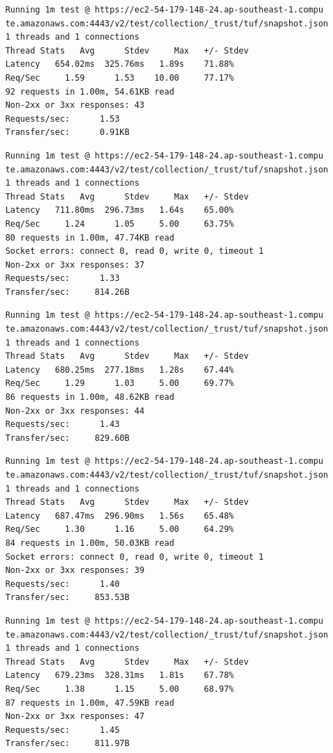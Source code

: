 \documentclass[a4paper,12pt]{article}
\newcounter{subsubsubsection}[subsubsection]
\begin{document}
{{	
	\begin{verbatim}
	Running 1m test @ https://ec2-54-179-148-24.ap-southeast-1.compu
	te.amazonaws.com:4443/v2/test/collection/_trust/tuf/snapshot.json
	1 threads and 1 connections
	Thread Stats   Avg      Stdev     Max   +/- Stdev
	Latency   654.02ms  325.76ms   1.89s    71.88%
	Req/Sec     1.59      1.53    10.00     77.17%
	92 requests in 1.00m, 54.61KB read
	Non-2xx or 3xx responses: 43
	Requests/sec:      1.53
	Transfer/sec:      0.91KB
	\end{verbatim}
	\begin{verbatim}
	Running 1m test @ https://ec2-54-179-148-24.ap-southeast-1.compu
	te.amazonaws.com:4443/v2/test/collection/_trust/tuf/snapshot.json
	1 threads and 1 connections
	Thread Stats   Avg      Stdev     Max   +/- Stdev
	Latency   711.80ms  296.73ms   1.64s    65.00%
	Req/Sec     1.24      1.05     5.00     63.75%
	80 requests in 1.00m, 47.74KB read
	Socket errors: connect 0, read 0, write 0, timeout 1
	Non-2xx or 3xx responses: 37
	Requests/sec:      1.33
	Transfer/sec:     814.26B
	\end{verbatim}
	\begin{verbatim}
	Running 1m test @ https://ec2-54-179-148-24.ap-southeast-1.compu
	te.amazonaws.com:4443/v2/test/collection/_trust/tuf/snapshot.json
	1 threads and 1 connections
	Thread Stats   Avg      Stdev     Max   +/- Stdev
	Latency   680.25ms  277.18ms   1.28s    67.44%
	Req/Sec     1.29      1.03     5.00     69.77%
	86 requests in 1.00m, 48.62KB read
	Non-2xx or 3xx responses: 44
	Requests/sec:      1.43
	Transfer/sec:     829.60B
	\end{verbatim}
	\begin{verbatim}
	Running 1m test @ https://ec2-54-179-148-24.ap-southeast-1.compu
	te.amazonaws.com:4443/v2/test/collection/_trust/tuf/snapshot.json
	1 threads and 1 connections
	Thread Stats   Avg      Stdev     Max   +/- Stdev
	Latency   687.47ms  296.90ms   1.56s    65.48%
	Req/Sec     1.30      1.16     5.00     64.29%
	84 requests in 1.00m, 50.03KB read
	Socket errors: connect 0, read 0, write 0, timeout 1
	Non-2xx or 3xx responses: 39
	Requests/sec:      1.40
	Transfer/sec:     853.53B
	\end{verbatim}
	\newpage
	\begin{verbatim}
	Running 1m test @ https://ec2-54-179-148-24.ap-southeast-1.compu
	te.amazonaws.com:4443/v2/test/collection/_trust/tuf/snapshot.json
	1 threads and 1 connections
	Thread Stats   Avg      Stdev     Max   +/- Stdev
	Latency   679.23ms  328.31ms   1.81s    67.78%
	Req/Sec     1.38      1.15     5.00     68.97%
	87 requests in 1.00m, 47.59KB read
	Non-2xx or 3xx responses: 47
	Requests/sec:      1.45
	Transfer/sec:     811.97B
	\end{verbatim}
	\newpage
	
}}
\end{document}
